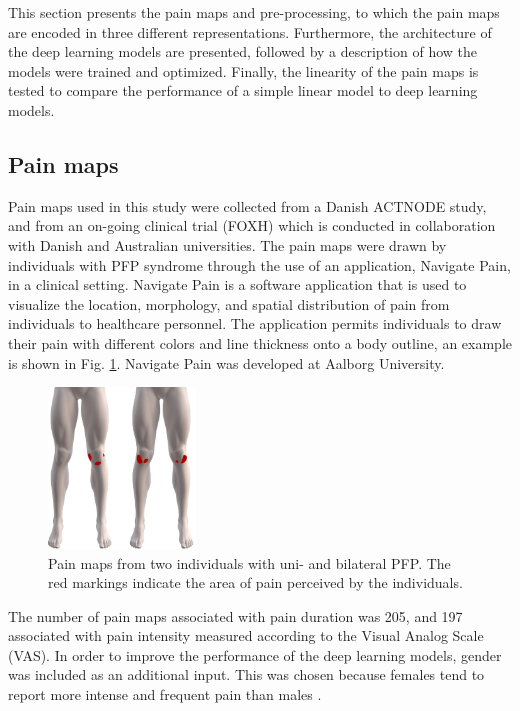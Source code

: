 This section presents the pain maps and pre-processing, to which the pain maps are encoded in three different representations. Furthermore, the architecture of the deep learning models are presented, followed by a description of how the models were trained and optimized. Finally, the linearity of the pain maps is tested to compare the performance of a simple linear model to deep learning models.

\subsection{Pain maps}
Pain maps used in this study were collected from a Danish ACTNODE study, and from an on-going clinical trial (FOXH) which is conducted in collaboration with Danish and Australian universities. The pain maps were drawn by individuals with PFP syndrome through the use of an application, Navigate Pain, in a clinical setting. \newline
\noindent
Navigate Pain is a software application that is used to visualize the location, morphology, and spatial distribution of pain from individuals to healthcare personnel. The application permits individuals to draw their pain with different colors and line thickness onto a body outline, an example is shown in Fig. \ref{fig:twoPainmaps}. Navigate Pain was developed at Aalborg University.\citep{Solutions2015}

\begin{figure}[H]
\centering
\includegraphics[width=0.35\textwidth]{Figures/twoPainmaps}
\caption{Pain maps from two individuals with uni- and bilateral PFP. The red markings indicate the area of pain perceived by the individuals.}
\label{fig:twoPainmaps}
\end{figure}

\noindent
The number of pain maps associated with pain duration was 205, and 197 associated with pain intensity measured according to the Visual Analog Scale (VAS).
In order to improve the performance of the deep learning models, gender was included as an additional input. This was chosen because females tend to report more intense and frequent pain than males \citep{Pieh2012}. 

